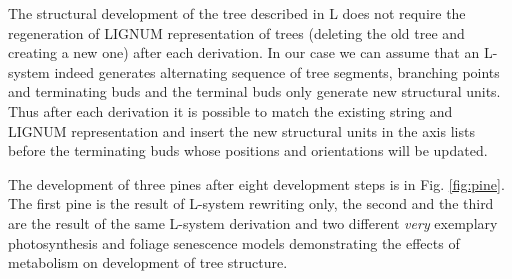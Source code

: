 The structural development of the tree described in L does not require
the regeneration  of LIGNUM representation of trees  (deleting the old
tree and  creating a new one)  after each derivation.  In  our case we
can assume  that an L-system indeed generates  alternating sequence of
tree segments, branching points  and terminating buds and the terminal
buds only  generate new structural units.  Thus  after each derivation
it is possible to match  the existing string and LIGNUM representation
and  insert the  new structural  units in  the axis  lists  before the
terminating buds whose positions and orientations will be updated.

The development  of three  pines after eight  development steps  is in
Fig.   \ref{fig:pine}.  The  first  pine  is the  result  of  L-system
rewriting only,  the second and the  third are the result  of the same
L-system   derivation   and  two   different   {\it  very}   exemplary
photosynthesis and foliage senescence models demonstrating the effects
of metabolism on development of tree structure.



